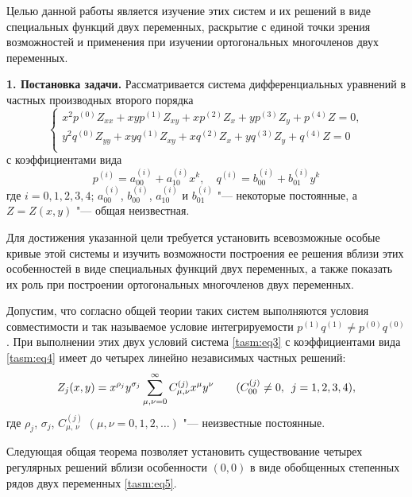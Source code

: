 Целью данной работы является изучение этих систем и их решений в
виде специальных функций двух переменных, раскрытие с единой точки зрения
возможностей и применения при изучении ортогональных
многочленов  двух переменных.

\smallskip

\textbf{1.  Постановка задачи.} Рассматривается система дифференциальных уравнений в частных производных второго порядка
\begin{equation}
\left\{
\begin{array}{l}
x^{2}p^{(0)}    Z_{xx}+xyp^{(1)}    Z_{xy}+xp^{(2)}   
Z_{x}+yp^{(3)}    Z_{y}+p^{(4)}    Z=0,\\[0.2cm]
y^{2}q^{(0)}    Z_{yy}+xyq^{(1)}     Z_{xy}+xq^{(2)}    
Z_{x}+yq^{(3)}     Z_{y}+q^{(4)}    Z=0\\
\end{array}
\right.
\label{tasm:eq3}
\end{equation}
с коэффициентами вида
\begin{equation}
p^{(i)}=a^{(i)}_{00}+a^{(i)}_{10}    x^{k},  \quad
q^{(i)}=b^{(i)}_{00}+b^{(i)}_{01}    y^{k}
\label{tasm:eq4}
\end{equation}
где $i=0, 1, 2, 3, 4$; $a^{(i)}_{00}$, $b^{(i)}_{00}$,
$a^{(i)}_{10}$ и $b^{(i)}_{01}$ "--- некоторые постоянные, а~$Z=Z(x,y)$ "--- общая неизвестная.

Для достижения указанной цели требуется установить всевозможные особые кривые этой системы и изучить возможности построения ее
решения вблизи этих особенностей в виде специальных функций двух переменных, а также показать их роль при построении ортогональных многочленов двух переменных.

Допустим, что согласно общей теории таких систем выполняются условия совместимости и так называемое условие интегрируемости
$p^{(1)}q^{(1)}\neq p^{(0)}q^{(0)}$. 
При выполнении этих двух  условий \cite{tasm:2} система \eqref{tasm:eq3} с коэффициентами вида \eqref{tasm:eq4} имеет до четырех
линейно независимых частных решений:
\begin{equation}
Z_{j}(x,y)=x^{\rho_{j}}    y^{\sigma_{j}}   
\sum_{\mu,\nu=0}^{\infty} C_{\mu,\nu}^{(j)}    x^{\mu}   
y^{\nu} \qquad{} (C_{00}^{(j)}\neq 0, \enskip j=1, 2, 3, 4),
\label{tasm:eq5}
\end{equation}
где $\rho_{j}$, $\sigma_{j}$, $C_{\mu,\,\nu}^{(j)}$ $(\mu, \nu=0, 1, 2, \dots)$ "--- неизвестные постоянные.

Следующая общая теорема позволяет установить существование четырех
регулярных решений вблизи особенности $(0, 0)$ в виде обобщенных
степенных рядов двух переменных \eqref{tasm:eq5}.

